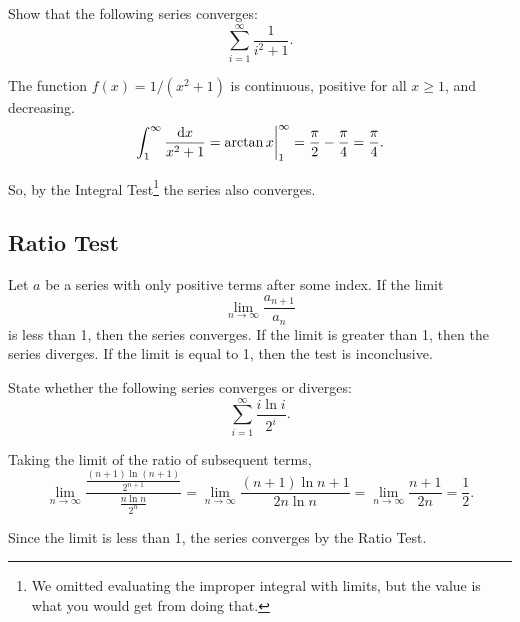 \begin{example}
	Show that the following series converges:
	\begin{equation*}
		\sum_{i=1}^{\infty}{\frac{1}{i^2+1}}.
	\end{equation*}
\end{example}
\begin{answer}
	The function $f(x)=1/(x^2+1)$ is continuous, positive for all $x \geq 1$, and decreasing.
	\begin{equation*}
		\int_{1}^{\infty}{\frac{\mathrm{d} x}{x^2+1}} = \arctan{x}\biggr\rvert_{1}^{\infty} = \frac{\pi}{2} - \frac{\pi}{4} = \frac{\pi}{4}.
	\end{equation*}
	
	So, by the Integral Test\footnote{We omitted evaluating the improper integral with limits, but the value is what you would get from doing that.} the series also converges.
\end{answer}

\subsection{Ratio Test}
\begin{lemma}
	Let $a$ be a series with only positive terms after some index.
	If the limit
	\begin{equation*}
		\lim_{n\to\infty}{\frac{a_{n+1}}{a_n}}
	\end{equation*}
	is less than 1, then the series converges.
	If the limit is greater than 1, then the series diverges.
	If the limit is equal to 1, then the test is inconclusive.
\end{lemma}

\begin{example}
	State whether the following series converges or diverges:
	\begin{equation*}
		\sum_{i=1}^{\infty}{\frac{i\ln{i}}{2^i}}.
	\end{equation*}
\end{example}
\begin{answer}
	Taking the limit of the ratio of subsequent terms,
	\begin{equation*}
		\lim_{n\to\infty}{\frac{\frac{(n+1)\ln{(n+1)}}{2^{n+1}}}{\frac{n\ln{n}}{2^n}}} = \lim_{n\to\infty}{\frac{(n+1)\ln{n+1}}{2n\ln{n}}} = \lim_{n\to\infty}{\frac{n+1}{2n}} = \frac{1}{2}.
	\end{equation*}
	
	Since the limit is less than 1, the series converges by the Ratio Test.
\end{answer}

